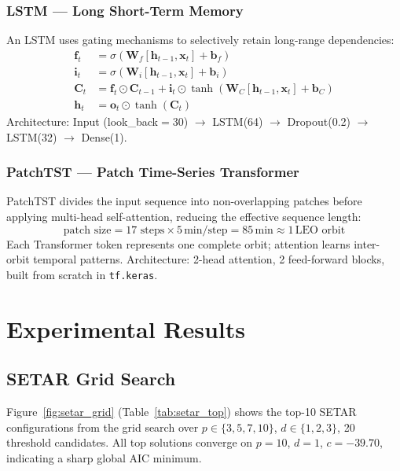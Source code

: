 \documentclass[conference]{IEEEtran}
\begin{document}
\subsubsection{LSTM --- Long Short-Term Memory}
An LSTM \cite{hochreiter1997} uses gating mechanisms to selectively retain
long-range dependencies:
\begin{align}
\mathbf{f}_t &= \sigma(\mathbf{W}_f [\mathbf{h}_{t-1}, \mathbf{x}_t] + \mathbf{b}_f) \\
\mathbf{i}_t &= \sigma(\mathbf{W}_i [\mathbf{h}_{t-1}, \mathbf{x}_t] + \mathbf{b}_i) \\
\mathbf{C}_t &= \mathbf{f}_t \odot \mathbf{C}_{t-1}
               + \mathbf{i}_t \odot \tanh(\mathbf{W}_C [\mathbf{h}_{t-1}, \mathbf{x}_t] + \mathbf{b}_C) \\
\mathbf{h}_t &= \mathbf{o}_t \odot \tanh(\mathbf{C}_t)
\end{align}
Architecture: Input (look\_back$=30$) $\to$ LSTM(64) $\to$ Dropout(0.2)
$\to$ LSTM(32) $\to$ Dense(1).

\subsubsection{PatchTST --- Patch Time-Series Transformer}
PatchTST \cite{nie2023} divides the input sequence into non-overlapping patches
before applying multi-head self-attention, reducing the effective sequence
length:
\begin{equation}
\text{patch size} = 17 \text{ steps} \times 5\,\text{min/step} = 85\,\text{min} \approx 1\,\text{LEO orbit}
\end{equation}
Each Transformer token represents one complete orbit; attention learns
inter-orbit temporal patterns. Architecture: 2-head attention, 2 feed-forward
blocks, built from scratch in \texttt{tf.keras}.

\section{Experimental Results}
\label{sec:results}

\subsection{SETAR Grid Search}

Figure~\ref{fig:setar_grid} (Table~\ref{tab:setar_top}) shows the top-10
SETAR configurations from the grid search over
$p \in \{3,5,7,10\}$, $d \in \{1,2,3\}$, 20 threshold candidates.
All top solutions converge on $p=10$, $d=1$, $c=-39.70$, indicating a
sharp global AIC minimum.
\end{document}
